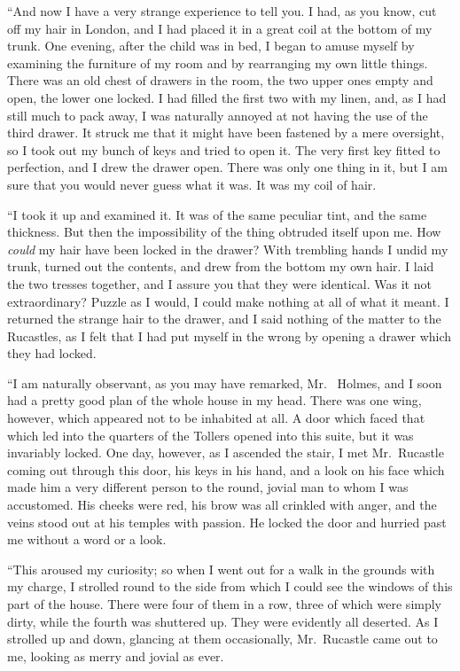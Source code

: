 “And now I have a very strange experience to tell you. I
had, as you know, cut off my hair in London, and I had
placed it in a great coil at the bottom of my trunk. One
evening, after the child was in bed, I began to amuse myself
by examining the furniture of my room and by rearranging
my own little things. There was an old chest of drawers in
the room, the two upper ones empty and open, the lower one
locked. I had filled the first two with my linen, and, as I had
still much to pack away, I was naturally annoyed at not having
the use of the third drawer. It struck me that it might
have been fastened by a mere oversight, so I took out my
bunch of keys and tried to open it. The very first key fitted
to perfection, and I drew the drawer open. There was only
one thing in it, but I am sure that you would never guess what
it was. It was my coil of hair.

“I took it up and examined it. It was of the same peculiar
tint, and the same thickness. But then the impossibility of
the thing obtruded itself upon me. How \textit{could} my hair have
been locked in the drawer? With trembling hands I undid
my trunk, turned out the contents, and drew from the bottom
my own hair. I laid the two tresses together, and I assure
you that they were identical. Was it not extraordinary? Puzzle
as I would, I could make nothing at all of what it meant.
I returned the strange hair to the drawer, and I said nothing
of the matter to the Rucastles, as I felt that I had put
myself in the wrong by opening a drawer which they had
locked.

“I am naturally observant, as you may have remarked, Mr.\ %
Holmes, and I soon had a pretty good plan of the whole
house in my head. There was one wing, however, which appeared
not to be inhabited at all. A door which faced that
which led into the quarters of the Tollers opened into this
suite, but it was invariably locked. One day, however, as I
ascended the stair, I met Mr.~Rucastle coming out through
this door, his keys in his hand, and a look on his face which
made him a very different person to the round, jovial man to
whom I was accustomed. His cheeks were red, his brow was
all crinkled with anger, and the veins stood out at his temples
with passion. He locked the door and hurried past me without
a word or a look.

“This aroused my curiosity; so when I went out for a walk
in the grounds with my charge, I strolled round to the side
from which I could see the windows of this part of the house.
There were four of them in a row, three of which were simply
dirty, while the fourth was shuttered up. They were evidently
all deserted. As I strolled up and down, glancing at them
occasionally, Mr.~Rucastle came out to me, looking as merry
and jovial as ever.

